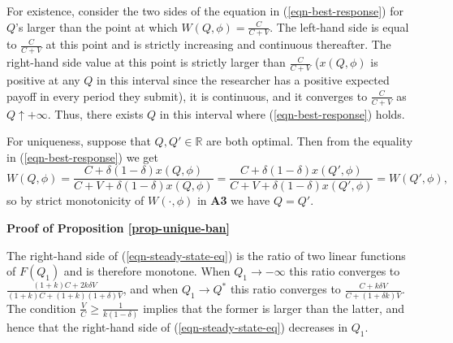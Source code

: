 \documentclass[12pt]{article}
\theoremstyle{plain}
\theoremstyle{definition}
\theoremstyle{remark}
\def\RR{\mathbb{R}}
\begin{document}
    For existence, consider the two sides of the equation in (\ref{eqn-best-response}) for $Q$'s larger than the point at which $W(Q,\phi)=\frac{C}{C+V}$. The left-hand side is equal to $\frac{C}{C+V}$ at this point and is strictly increasing and continuous thereafter. The right-hand side value at this point is strictly larger than $\frac{C}{C+V}$ ($x(Q,\phi)$ is positive at any $Q$ in this interval since the researcher has a positive expected payoff in every period they submit), it is continuous, and it converges to $\frac{C}{C+V}$ as $Q\uparrow +\infty$. Thus, there exists $Q$ in this interval where (\ref{eqn-best-response}) holds.
            
        
    For uniqueness, suppose that $Q,Q'\in \RR$ are both optimal. Then from the equality in (\ref{eqn-best-response}) we get 
    $$W(Q,\phi)= \frac{C+\delta(1-\delta)x(Q,\phi)}{C+V+\delta(1-\delta)x(Q,\phi)} = \frac{C+\delta(1-\delta)x(Q',\phi)}{C+V+\delta(1-\delta)x(Q',\phi)} = W(Q',\phi),$$
    so by strict monotonicity of $W(\cdot,\phi)$ in \textbf{A3} we have $Q=Q'$.

\bigskip

\noindent \textbf{Proof of Proposition \ref{prop-unique-ban}}

     The right-hand side of (\ref{eqn-steady-state-eq}) is the ratio of two linear functions of $F(Q_1)$ and is therefore monotone. When $Q_1 \to -\infty$ this ratio converges to $\frac{(1+k)C+2k\delta V}{(1+k)C+(1+k)(1+\delta)V}$, and when $Q_1\to Q^*$ this ratio converges to $\frac{C+k\delta V}{C+(1+\delta k)V}$. The condition $\frac{V}{C}\ge \frac{1}{k(1-\delta)}$ implies that the former is larger than the latter, and hence that the right-hand side of (\ref{eqn-steady-state-eq}) decreases in $Q_1$. 
    
\end{document}

